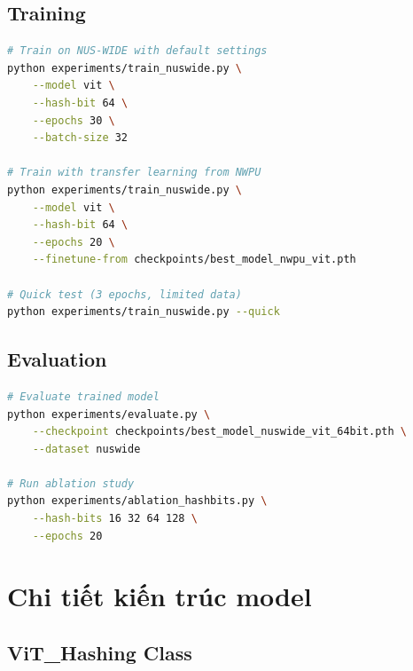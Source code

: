 \documentclass[12pt,a4paper]{article}
\begin{document}
\subsection{Training}

\begin{lstlisting}[language=bash,caption={Training commands}]
# Train on NUS-WIDE with default settings
python experiments/train_nuswide.py \
    --model vit \
    --hash-bit 64 \
    --epochs 30 \
    --batch-size 32

# Train with transfer learning from NWPU
python experiments/train_nuswide.py \
    --model vit \
    --hash-bit 64 \
    --epochs 20 \
    --finetune-from checkpoints/best_model_nwpu_vit.pth

# Quick test (3 epochs, limited data)
python experiments/train_nuswide.py --quick
\end{lstlisting}

\subsection{Evaluation}

\begin{lstlisting}[language=bash,caption={Evaluation commands}]
# Evaluate trained model
python experiments/evaluate.py \
    --checkpoint checkpoints/best_model_nuswide_vit_64bit.pth \
    --dataset nuswide

# Run ablation study
python experiments/ablation_hashbits.py \
    --hash-bits 16 32 64 128 \
    --epochs 20
\end{lstlisting}

\section{Chi tiết kiến trúc model}

\subsection{ViT\_Hashing Class}
\end{document}
